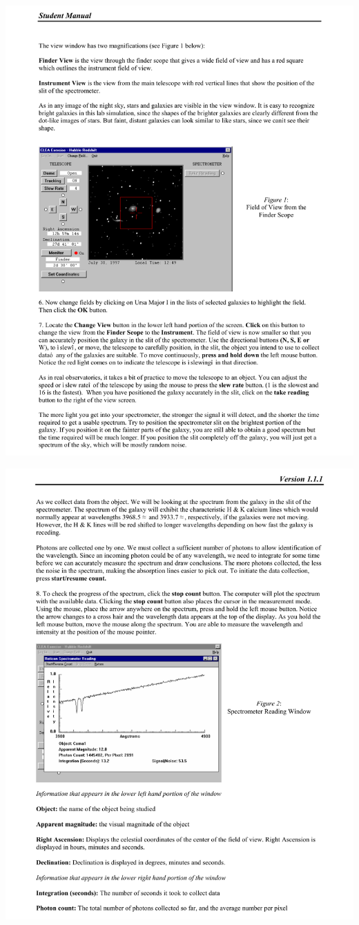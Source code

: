 \includegraphics[width=\textwidth]{hubble/hubble4.pdf}
\vfil\eject

\includegraphics[width=\textwidth]{hubble/hubble5.pdf}
\vfil\eject

